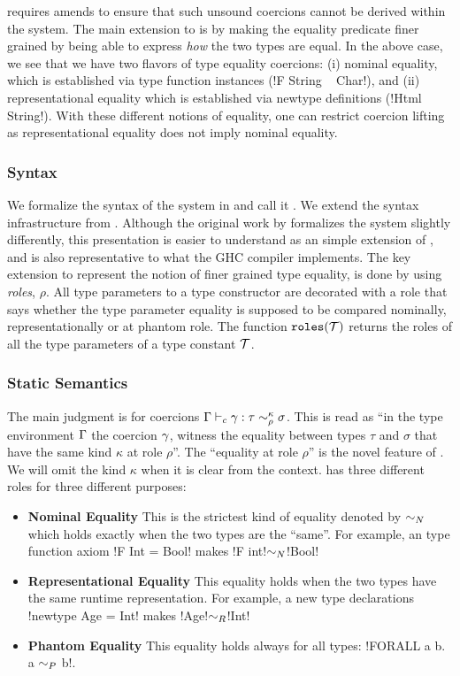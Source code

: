 \documentclass[manuscript,screen,nonacm]{acmart}
\begin{document}
\SFC requires amends to ensure that such unsound coercions cannot be derived within the system.
The main extension to \SFC is by making the equality predicate finer grained by being able to express \emph{how} the two types are equal. In the above case, we see that we have two flavors of type equality coercions: (i) nominal equality, which is established via type function instances (!F String ~ Char!), and (ii) representational equality which is established via newtype definitions (!Html ~ String!). With these different notions of equality, one can restrict coercion lifting as representational equality does not imply nominal equality.

\subsubsection{Syntax}
We formalize the syntax of the system in  and call it \SFR. We extend the syntax infrastructure from . Although the original work by \citet{breitner_safe_2014, weirich_generative_2011} formalizes the system slightly differently, this presentation is easier to understand as an simple extension of \SFC, and is also representative to what the GHC compiler implements. The key extension to represent the notion of finer grained type equality, is done by using \emph{roles}, $\rho$. All type parameters to a type constructor are decorated with a role that says whether the type parameter equality is supposed to be compared nominally, representationally or at phantom role. The function $\texttt{roles}(\mathcal{T})$ returns the roles of all the type parameters of a type constant $\mathcal{T}$.

\subsubsection{Static Semantics}
The main judgment is for coercions $\Gamma \vdash_{c} \gamma : \tau\sim^\kappa_\rho\sigma$. This is read as ``in the type environment $\Gamma$ the coercion $\gamma$, witness the equality between types $\tau$ and $\sigma$ that have the same kind $\kappa$ at role $\rho$''. The ``equality at role $\rho$'' is the novel feature of \SFR. We will omit the kind $\kappa$ when it is clear from the context. \SFR has three different roles for three different purposes:
\begin{itemize}
\item\textbf{Nominal Equality} This is the strictest kind of equality denoted by $\mathrel{\sim_N}$ which holds exactly when the two types are the ``same''. For example, an type function axiom !F Int = Bool! makes !F int!$\mathrel{\sim_N}$!Bool!
\item\textbf{Representational Equality} This equality holds when the two types have the same runtime representation. For example, a new type declarations !newtype Age = Int! makes !Age!$\mathrel{\sim_R}$!Int!
\item\textbf{Phantom Equality} This equality holds always for all types: !FORALL a b. a $\mathrel{\sim_P}$ b!.
\end{itemize}
\end{document}
